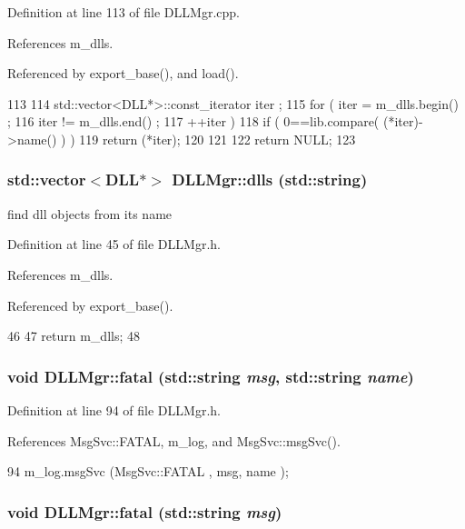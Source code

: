 Definition at line 113 of file DLLMgr.cpp.

References m\_\-dlls.

Referenced by export\_\-base(), and load().


\begin{DoxyCode}
113                                  {
114   std::vector<DLL*>::const_iterator iter ;
115   for ( iter = m_dlls.begin() ; 
116         iter != m_dlls.end()  ; 
117         ++iter ) {
118     if ( 0==lib.compare( (*iter)->name() ) ){
119       return (*iter);
120     }
121   }
122   return NULL;
123 }
\end{DoxyCode}
\hypertarget{classDLLMgr_a40a2b326bd4f01e58b4afa78a3773898}{
\subsubsection[{dlls}]{\setlength{\rightskip}{0pt plus 5cm}std::vector$<${\bf DLL}$\ast$$>$ DLLMgr::dlls (std::string)}}
\label{classDLLMgr_a40a2b326bd4f01e58b4afa78a3773898}
find dll objects from its name 

Definition at line 45 of file DLLMgr.h.

References m\_\-dlls.

Referenced by export\_\-base().


\begin{DoxyCode}
46   {
47     return m_dlls;
48   }
\end{DoxyCode}
\hypertarget{classDLLMgr_add7f622101c74721181402ba26072668}{
\subsubsection[{fatal}]{\setlength{\rightskip}{0pt plus 5cm}void DLLMgr::fatal (std::string {\em msg}, \/  std::string {\em name})}}
\label{classDLLMgr_add7f622101c74721181402ba26072668}


Definition at line 94 of file DLLMgr.h.

References MsgSvc::FATAL, m\_\-log, and MsgSvc::msgSvc().


\begin{DoxyCode}
94 { m_log.msgSvc (MsgSvc::FATAL   , msg, name ); }
\end{DoxyCode}
\hypertarget{classDLLMgr_ac45919d4588b964a7ca3a8e2abed3cc2}{
\subsubsection[{fatal}]{\setlength{\rightskip}{0pt plus 5cm}void DLLMgr::fatal (std::string {\em msg})}}
\label{classDLLMgr_ac45919d4588b964a7ca3a8e2abed3cc2}


